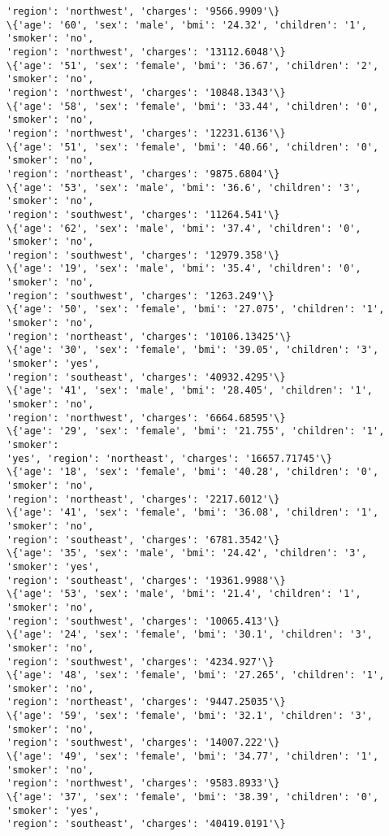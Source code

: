 \documentclass[11pt]{article}
\begin{document}
\begin{Verbatim}[commandchars=\\\{\}]
'region': 'northwest', 'charges': '9566.9909'\}
\{'age': '60', 'sex': 'male', 'bmi': '24.32', 'children': '1', 'smoker': 'no',
'region': 'northwest', 'charges': '13112.6048'\}
\{'age': '51', 'sex': 'female', 'bmi': '36.67', 'children': '2', 'smoker': 'no',
'region': 'northwest', 'charges': '10848.1343'\}
\{'age': '58', 'sex': 'female', 'bmi': '33.44', 'children': '0', 'smoker': 'no',
'region': 'northwest', 'charges': '12231.6136'\}
\{'age': '51', 'sex': 'female', 'bmi': '40.66', 'children': '0', 'smoker': 'no',
'region': 'northeast', 'charges': '9875.6804'\}
\{'age': '53', 'sex': 'male', 'bmi': '36.6', 'children': '3', 'smoker': 'no',
'region': 'southwest', 'charges': '11264.541'\}
\{'age': '62', 'sex': 'male', 'bmi': '37.4', 'children': '0', 'smoker': 'no',
'region': 'southwest', 'charges': '12979.358'\}
\{'age': '19', 'sex': 'male', 'bmi': '35.4', 'children': '0', 'smoker': 'no',
'region': 'southwest', 'charges': '1263.249'\}
\{'age': '50', 'sex': 'female', 'bmi': '27.075', 'children': '1', 'smoker': 'no',
'region': 'northeast', 'charges': '10106.13425'\}
\{'age': '30', 'sex': 'female', 'bmi': '39.05', 'children': '3', 'smoker': 'yes',
'region': 'southeast', 'charges': '40932.4295'\}
\{'age': '41', 'sex': 'male', 'bmi': '28.405', 'children': '1', 'smoker': 'no',
'region': 'northwest', 'charges': '6664.68595'\}
\{'age': '29', 'sex': 'female', 'bmi': '21.755', 'children': '1', 'smoker':
'yes', 'region': 'northeast', 'charges': '16657.71745'\}
\{'age': '18', 'sex': 'female', 'bmi': '40.28', 'children': '0', 'smoker': 'no',
'region': 'northeast', 'charges': '2217.6012'\}
\{'age': '41', 'sex': 'female', 'bmi': '36.08', 'children': '1', 'smoker': 'no',
'region': 'southeast', 'charges': '6781.3542'\}
\{'age': '35', 'sex': 'male', 'bmi': '24.42', 'children': '3', 'smoker': 'yes',
'region': 'southeast', 'charges': '19361.9988'\}
\{'age': '53', 'sex': 'male', 'bmi': '21.4', 'children': '1', 'smoker': 'no',
'region': 'southwest', 'charges': '10065.413'\}
\{'age': '24', 'sex': 'female', 'bmi': '30.1', 'children': '3', 'smoker': 'no',
'region': 'southwest', 'charges': '4234.927'\}
\{'age': '48', 'sex': 'female', 'bmi': '27.265', 'children': '1', 'smoker': 'no',
'region': 'northeast', 'charges': '9447.25035'\}
\{'age': '59', 'sex': 'female', 'bmi': '32.1', 'children': '3', 'smoker': 'no',
'region': 'southwest', 'charges': '14007.222'\}
\{'age': '49', 'sex': 'female', 'bmi': '34.77', 'children': '1', 'smoker': 'no',
'region': 'northwest', 'charges': '9583.8933'\}
\{'age': '37', 'sex': 'female', 'bmi': '38.39', 'children': '0', 'smoker': 'yes',
'region': 'southeast', 'charges': '40419.0191'\}

\end{Verbatim}
\end{document}
